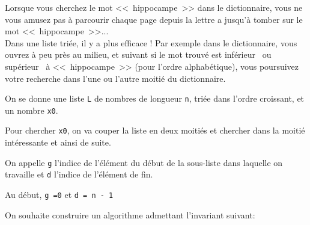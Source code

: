 Lorsque vous cherchez le mot <<~hippocampe~>> dans le dictionnaire, vous ne vous amusez pas à parcourir chaque page depuis la lettre a jusqu'à tomber sur le mot <<~hippocampe~>>...\\
Dans une liste triée, il y a plus efficace ! Par exemple dans le dictionnaire, vous ouvrez à peu près au milieu, et suivant si le mot trouvé est \og inférieur \fg \ ou \og supérieur \fg \ à <<~hippocampe~>> (pour l'ordre alphabétique), vous poursuivez votre recherche dans l'une ou l'autre moitié du dictionnaire.


\begin{prop}
On se donne une liste \texttt{L} de nombres de longueur \texttt{n},     {triée dans l'ordre croissant}, et un nombre \texttt{x0}. 

Pour chercher \texttt{x0}, on va couper la liste en deux moitiés et chercher dans la moitié intéressante et ainsi de suite.

On appelle \texttt{g}     {l'indice} de l'élément du début de la sous-liste dans laquelle on travaille et \texttt{d}     {l'indice} de l'élément de fin.

Au début, \texttt{g =0} et \texttt{d = n - 1} 

On souhaite construire un algorithme admettant l'invariant suivant:
\bigskip

\centerline{}
\end{prop}



